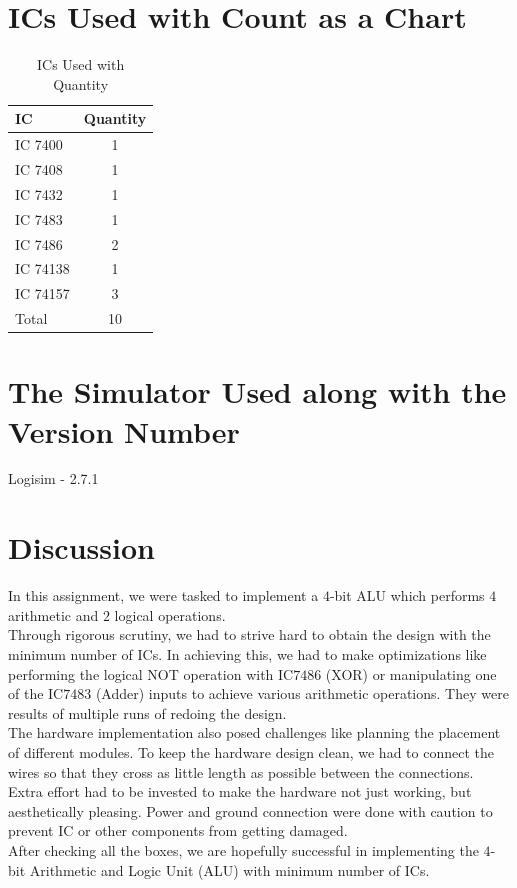 \documentclass[12pt]{article}
\begin{document}
\newpage
\section{\large{ICs Used with Count as a Chart}}
\begin{table}[H]
    \centering
    \begin{tabular}{lc}
         \textbf{IC} & \textbf{Quantity}  \\
         \hline
         \hline
         IC 7400 & 1  \\
         IC 7408 & 1  \\
         IC 7432 & 1  \\
         IC 7483 & 1  \\
         IC 7486 & 2  \\
         IC 74138 & 1  \\
         IC 74157 & 3  \\
         \hline
         Total & 10  \\
    \end{tabular}
    \caption{ICs Used with Quantity}
    \label{tab:ic_quantity}
\end{table}


\newpage
\section{\large{The Simulator Used along with the Version Number}}
Logisim - 2.7.1

\section{\large{Discussion}}
In this assignment, we were tasked to implement a $4$-bit ALU which performs $4$ arithmetic and $2$ logical operations.\\
Through rigorous scrutiny, we had to strive hard to obtain the design with the minimum number of ICs. In achieving this, we had to make optimizations like performing the logical NOT operation with IC$7486$ (XOR) or manipulating one of the IC$7483$ (Adder) inputs to achieve various arithmetic operations. They were results of multiple runs of redoing the design.\\
The hardware implementation also posed challenges like planning the placement of different modules. To keep the hardware design clean, we had to connect the wires so that they cross as little length as possible between the connections. Extra effort had to be invested to make the hardware not just working, but aesthetically pleasing. Power and ground connection were done with caution to prevent IC or other components from getting damaged. \\
After checking all the boxes, we are hopefully successful in implementing the $4$-bit Arithmetic and Logic Unit (ALU) with minimum number of ICs.
\end{document}
